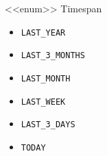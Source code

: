     \begin{Class}{<<enum>> Timespan}
        \begin{itemize}
            \item \texttt{LAST\_YEAR}
            \item \texttt{LAST\_3\_MONTHS}
            \item \texttt{LAST\_MONTH}
            \item \texttt{LAST\_WEEK}
            \item \texttt{LAST\_3\_DAYS}
            \item \texttt{TODAY}
        \end{itemize}
    \end{Class}